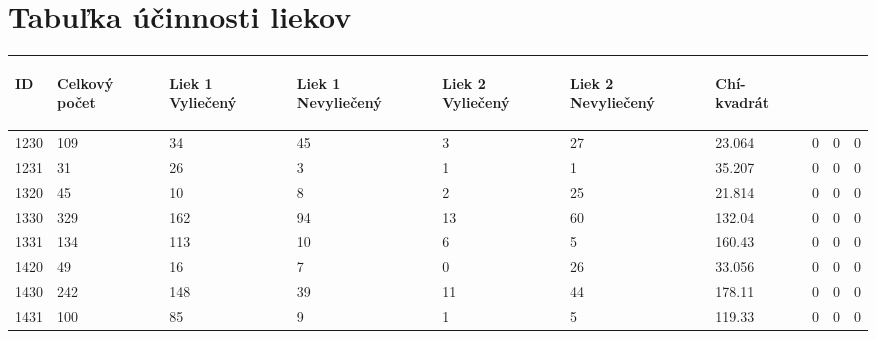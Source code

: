 \section{Tabuľka účinnosti liekov}
\label{app:ucinnost-liekov}

\begin{longtable}{llllllllll}
\hline
\begin{sideways} ID \end{sideways} & \begin{sideways} Celkový počet \end{sideways} & \begin{sideways} Liek 1 Vyliečený \end{sideways} & \begin{sideways} Liek 1 Nevyliečený \end{sideways} & \begin{sideways} Liek 2 Vyliečený \end{sideways} & \begin{sideways} Liek 2 Nevyliečený \end{sideways} & \begin{sideways} Chí-kvadrát\end{sideways} &   &   &   \\ \hline
1230 & 109           & 34               & 45                 & 3                & 27                 & 23.064 & 0 & 0 & 0 \\
1231 & 31            & 26               & 3                  & 1                & 1                  & 35.207 & 0 & 0 & 0 \\
1320 & 45            & 10               & 8                  & 2                & 25                 & 21.814 & 0 & 0 & 0 \\
1330 & 329           & 162              & 94                 & 13               & 60                 & 132.04 & 0 & 0 & 0 \\
1331 & 134           & 113              & 10                 & 6                & 5                  & 160.43 & 0 & 0 & 0 \\
1420 & 49            & 16               & 7                  & 0                & 26                 & 33.056 & 0 & 0 & 0 \\
1430 & 242           & 148              & 39                 & 11               & 44                 & 178.11 & 0 & 0 & 0 \\
1431 & 100           & 85               & 9                  & 1                & 5                  & 119.33 & 0 & 0 & 0 \\

\end{longtable}
